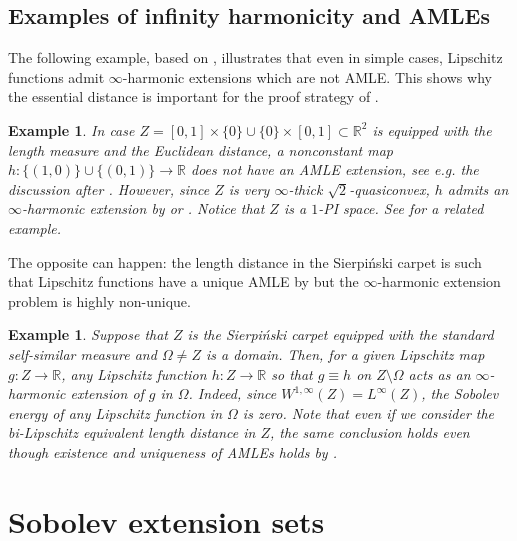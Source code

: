 \documentclass[reqno]{amsart}
\numberwithin{equation}{section}
\newtheorem{example}[theorem]{Example}
\theoremstyle{remark}
\begin{document}
\subsection{Examples of infinity harmonicity and AMLEs}
The following example, based on \cite{Aron:Cran:Juu:04}, illustrates that even in simple cases, Lipschitz functions admit $\infty$-harmonic extensions which are not AMLE. This shows why the essential distance is important for the proof strategy of .
\begin{example}\label{ex:necessityofrenorming}
{\em In case $Z = [0,1]\times\{0\} \cup \{0\} \times [0,1] \subset \mathbb{R}^2$ is equipped with the length measure and the Euclidean distance, a nonconstant map $h \colon \{ (1,0) \} \cup \{(0,1)\} \rightarrow \mathbb{R}$ does not have an AMLE extension, see e.g. the discussion after \cite[Theorem 1.4]{Per:Schr:Sheff:Wil:09}. However, since $Z$ is very $\infty$-thick $\sqrt{2}$-quasiconvex, $h$ admits an $\infty$-harmonic extension by \cite{Dur:Jar:Sha:19} or . Notice that $Z$ is a $1$-PI space. See \cite[Example 4.8]{Dur:Jar:Sha:19} for a related example.}
\end{example}

The opposite can happen: the length distance in the Sierpi\'nski carpet is such that Lipschitz functions have a unique AMLE by \cite{Juut:02,Per:Schr:Sheff:Wil:09} but the $\infty$-harmonic extension problem is highly non-unique.
\begin{example}\label{ex:renormingnotenough}
{\em Suppose that $Z$ is the Sierpi\'nski carpet equipped with the standard self-similar measure and $\Omega \neq Z$ is a domain. Then, for a given Lipschitz map $g \colon Z \rightarrow \mathbb{R}$, any Lipschitz function $h \colon Z\to\mathbb R$ so that $g\equiv h$ on $Z\setminus\Omega$ acts as an $\infty$-harmonic extension of $g$ in $\Omega$. Indeed, since $W^{1,\infty}(Z) = L^{\infty}(Z)$, the Sobolev energy of any Lipschitz function in $\Omega$ is zero. Note that even if we consider the bi-Lipschitz equivalent length distance in $Z$, the same conclusion holds even though existence and uniqueness of AMLEs holds by \cite{Per:Schr:Sheff:Wil:09}.}
\end{example}





\section{Sobolev extension sets}\label{sec:extension}
\end{document}
